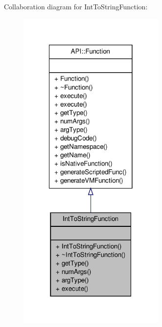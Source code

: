 Collaboration diagram for Int\-To\-String\-Function\-:
\nopagebreak
\begin{figure}[H]
\begin{center}
\leavevmode
\includegraphics[width=206pt]{class_int_to_string_function__coll__graph}
\end{center}
\end{figure}
